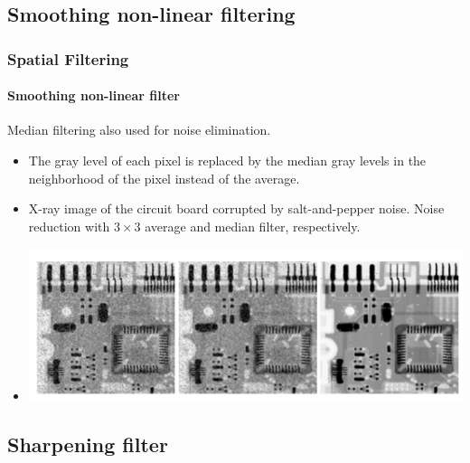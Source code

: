 \documentclass[table]{beamer}
\begin{document}
\subsection{Smoothing non-linear filtering}

\begin{frame}
\frametitle{Spatial Filtering}
\framesubtitle{Smoothing non-linear filter}
Median filtering also used for noise elimination. 
\begin{itemize}
\item The gray level of each pixel is replaced by the median gray levels in the neighborhood of the pixel instead of the average.
\item X-ray image of the circuit board corrupted by salt-and-pepper noise. Noise reduction with $3 \times 3$ average and median filter, respectively.
\item[]\begin{center}
\includegraphics[scale=0.3]{images/Spatial6-averagemedian.png}
\end{center}  
\end{itemize}
\end{frame}

\subsection{Sharpening filter}
\end{document}
